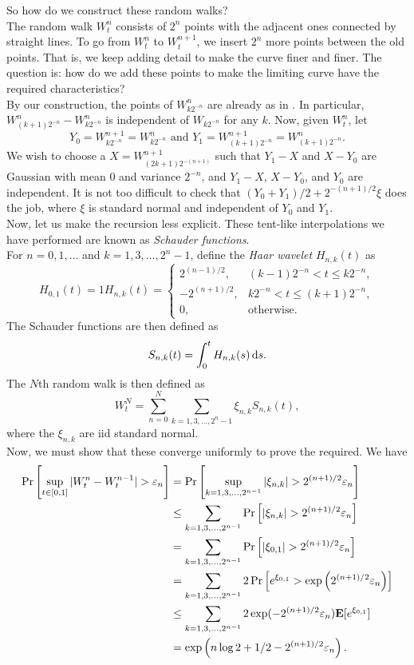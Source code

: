 So how do we construct these random walks?\\
The random walk $W_t^n$ consists of $2^n$ points with the adjacent ones connected by straight lines. To go from $W_t^n$ to $W_t^{n+1}$, we insert $2^n$ more points between the old points. That is, we keep adding detail to make the curve finer and finer. The question is: how do we add these points to make the limiting curve have the required characteristics?\\
By our construction, the points of $W_{k2^{-n}}^{n}$ are already as in . In particular, $W_{(k+1)2^{-n}}^n - W_{k2^{-n}}^n$ is independent of $W_{k2^{-n}}$ for any $k$. Now, given $W_t^n$, let
\[ Y_0 = W_{k2^{-n}}^{n+1} = W_{k2^{-n}}^n \text{ and } Y_1 = W_{(k+1)2^{-n}}^{n+1} = W_{(k+1)2^{-n}}^{n}. \]
We wish to choose a $X = W_{(2k+1)2^{-(n+1)}}^{n+1}$ such that $Y_1 - X$ and $X - Y_0$ are Gaussian with mean $0$ and variance $2^{-n}$, and $Y_1-X$, $X-Y_0$, and $Y_0$ are independent. It is not too difficult to check that $(Y_0 + Y_1)/2 + 2^{-(n+1)/2}\xi$ does the job, where $\xi$ is standard normal and independent of $Y_0$ and $Y_1$.\\

Now, let us make the recursion less explicit. These tent-like interpolations we have performed are known as \textit{Schauder functions}.\\
For $n=0,1,\ldots$ and $k=1,3,\ldots,2^n-1$, define the \textit{Haar wavelet} $H_{n,k}(t)$ as
\[
	H_{0,1}(t) = 1
	H_{n,k}(t) =
	\begin{cases}
		2^{(n-1)/2}, & (k-1)2^{-n} < t \leq k2^{-n}, \\
		-2^{(n+1)/2}, & k2^{-n} < t \leq (k+1)2^{-n}, \\
		0, & \text{otherwise.}
	\end{cases}
\]
The Schauder functions are then defined as
\[ S_{n,k}(t) = \int_0^t H_{n,k}(s)\operatorname{d}\!{s}. \]
The $N$th random walk is then defined as
\[ W_t^N = \sum_{n=0}^N \sum_{k=1,3,\ldots,2^n-1} \xi_{n,k} S_{n,k}(t), \]
where the $\xi_{n,k}$ are iid standard normal.\\
Now, we must show that these converge uniformly to prove the required.
We have
\begin{align*}
	\Pr\left[\sup_{t\in[0,1]} |W_t^n - W_t^{n-1}| > \varepsilon_n\right] &= \Pr\left[\sup_{k = 1,3,\ldots,2^{n-1}} |\xi_{n,k}| > 2^{(n+1)/2}\varepsilon_n\right] \\
		&\leq \sum_{k=1,3,\ldots,2^{n-1}} \Pr\left[|\xi_{n,k}| > 2^{(n+1)/2}\varepsilon_n\right] \\
		&= \sum_{k=1,3,\ldots,2^{n-1}} \Pr\left[|\xi_{0,1}| > 2^{(n+1)/2}\varepsilon_n\right] \\
		&= \sum_{k=1,3,\ldots,2^{n-1}} 2\Pr\left[e^{\xi_{0,1}} > \exp\left(2^{(n+1)/2}\varepsilon_n\right)\right] \\
		&\leq \sum_{k=1,3,\ldots,2^{n-1}} 2\exp(-2^{(n+1)/2}\varepsilon_n) \textbf{E}[e^{\xi_{0,1}}] \\
		&= \exp\left(n\log 2 + 1/2 - 2^{(n+1)/2}\varepsilon_n\right).
\end{align*}

